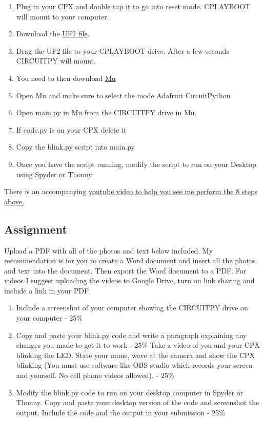 \begin{enumerate}[itemsep=-5pt]
\item Plug in your CPX and double tap it to go into reset
  mode. CPLAYBOOT will mount to your computer. 
\item Download the \href{https://circuitpython.org/downloads}{UF2
  file}.
\item Drag the UF2 file to your CPLAYBOOT drive. After a few seconds
  CIRCUITPY will mount.
\item You need to then download
  \href{https://codewith.mu/en/download}{Mu}
\item Open Mu and make sure to select the mode Adafruit CircuitPython
\item Open main.py in Mu from the CIRCUITPY drive in Mu.
\item If code.py is on your CPX delete it
\item Copy the blink.py script into main.py
\item Once you have the script running, modify the script to run on
  your Desktop using Spyder or Thonny
\end{enumerate}

There is an accompanying
\href{https://www.youtube.com/watch?v=XFvLn6rwm3I}{youtube video to
  help you see me perform the 8 steps above.}

\subsection{Assignment}

Upload a PDF with all of the photos and text below included. My
recommendation is for you to create a Word document and insert all the
photos and text into the document. Then export the Word document to a
PDF. For videos I suggest uploading the videos to Google Drive, turn
on link sharing and include a link in your PDF.

\begin{enumerate}[itemsept=-5pt]
\item Include a screenshot of your computer showing the CIRCUITPY drive on your computer - 25\%
\item Copy and paste your blink.py code and write a paragraph explaining any changes you made to get it to work - 25\%
\ite Take a video of you and your CPX blinking the LED. State your name, wave at the camera and show the CPX blinking (You must use software like OBS studio which records your screen and yourself. No cell phone videos allowed). - 25\%
\item Modify the blink.py code to run on your desktop computer in
  Spyder or Thonny. Copy and paste your desktop version of the code
  and screenshot the output. Include the code and the output in your
  submission - 25\%
\end{enumerate}
